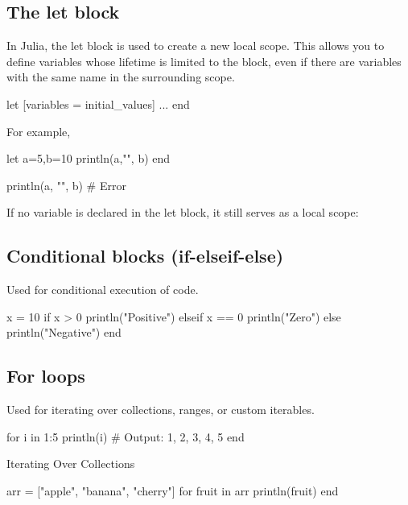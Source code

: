 \documentclass{report}
\begin{document}
    \pagebreak 
    \bigbreak \noindent 
    \subsection{The let block}
    \bigbreak \noindent 
    In Julia, the let block is used to create a new local scope. This allows you to define variables whose lifetime is limited to the block, even if there are variables with the same name in the surrounding scope.
    \bigbreak \noindent 
    \begin{jlcode}
        let [variables = initial_values]
            ...
        end
    \end{jlcode}
    \bigbreak \noindent 
    For example, 
    \bigbreak \noindent 
    \begin{jlcode}
        let a=5,b=10
            println(a,"\n", b)
        end

        println(a, "\n", b) # Error
    \end{jlcode}
    \bigbreak \noindent 
    If no variable is declared in the let block, it still serves as a local scope:
    \bigbreak \noindent 

    \bigbreak \noindent 
    \subsection{Conditional blocks (if-elseif-else)}
    \bigbreak \noindent 
    Used for conditional execution of code.
    \bigbreak \noindent 
    \begin{jlcode}
        x = 10
        if x > 0
            println("Positive")
            elseif x == 0
            println("Zero")
        else
            println("Negative")
        end
    \end{jlcode}

    \bigbreak \noindent 
    \subsection{For loops}
    \bigbreak \noindent 
    Used for iterating over collections, ranges, or custom iterables.
    \bigbreak \noindent 
    \begin{jlcode}
        for i in 1:5
            println(i)  # Output: 1, 2, 3, 4, 5
        end
    \end{jlcode}
    \bigbreak \noindent 
    Iterating Over Collections
    \bigbreak \noindent 
    \begin{jlcode}
        arr = ["apple", "banana", "cherry"]
        for fruit in arr
            println(fruit)
        end
    \end{jlcode}
\end{document}
